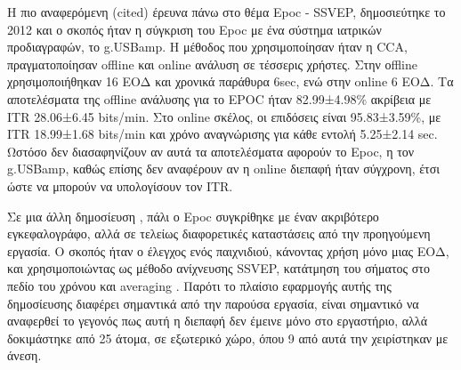 \documentclass[11pt,a4paper,english,greek,twoside]{../Thesis}
\begin{document}
\par Η πιο αναφερόμενη (cited) έρευνα πάνω στο θέμα Epoc - SSVEP, δημοσιεύτηκε το 2012 \cite{Liu2012-qj} και ο σκοπός ήταν η σύγκριση του Epoc με ένα σύστημα ιατρικών προδιαγραφών, το  g.USBamp. H μέθοδος που χρησιμοποίησαν ήταν η CCA, πραγματοποίησαν offline και online ανάλυση σε τέσσερις χρήστες. Στην οffline χρησιμοποιήθηκαν 16 ΕΟΔ και χρονικά παράθυρα 6sec, ενώ στην online 6 ΕΟΔ. Τα αποτελέσματα της offline ανάλυσης για το EPOC ήταν 82.99±4.98\% ακρίβεια με ITR 28.06±6.45 bits/min. Στο online σκέλος, οι επιδόσεις είναι 95.83±3.59\%, με ITR 18.99±1.68 bits/min και χρόνο αναγνώρισης για κάθε εντολή 5.25±2.14 sec. Ωστόσο δεν διασαφηνίζουν αν αυτά τα αποτελέσματα αφορούν το Epoc, η τον g.USBamp, καθώς επίσης δεν αναφέρουν αν η online διεπαφή ήταν σύγχρονη, έτσι ώστε να μπορούν να υπολογίσουν τον ITR. 

\par Σε μια άλλη δημοσίευση \cite{noauthor_undated-vk}, πάλι ο Epoc συγκρίθηκε με έναν ακριβότερο εγκεφαλογράφο, αλλά σε τελείως διαφορετικές καταστάσεις από την προηγούμενη εργασία. Ο σκοπός ήταν ο έλεγχος ενός παιχνιδιού, κάνοντας χρήση μόνο μιας ΕΟΔ, και χρησιμοποιώντας ως μέθοδο ανίχνευσης SSVEP, κατάτμηση του σήματος στο πεδίο του χρόνου και averaging \cite{Friman2007-xm}. Παρότι το πλαίσιο εφαρμογής αυτής της δημοσίευσης διαφέρει σημαντικά από την παρούσα εργασία, είναι σημαντικό να αναφερθεί το γεγονός πως αυτή η διεπαφή δεν έμεινε μόνο στο εργαστήριο, αλλά δοκιμάστηκε από 25 άτομα, σε εξωτερικό χώρο, όπου 9 από αυτά την χειρίστηκαν με άνεση.


\end{document}
